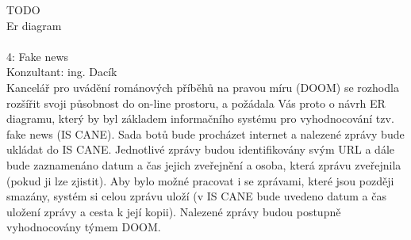 \documentclass{article}
\begin{document}
    TODO    \\
    Er diagram \\ \\

    4: Fake news \\
    Konzultant: ing. Dacík\\
    Kancelář pro uvádění románových příběhů na pravou míru (DOOM) se rozhodla rozšířit svoji působnost do on-line prostoru, a požádala Vás proto o návrh ER diagramu, který by byl základem informačního systému pro vyhodnocování tzv. fake news (IS CANE). Sada botů bude procházet internet a nalezené zprávy bude ukládat do IS CANE. Jednotlivé zprávy budou identifikovány svým URL a dále bude zaznamenáno datum a čas jejich zveřejnění a osoba, která zprávu zveřejnila (pokud ji lze zjistit). Aby bylo možné pracovat i se zprávami, které jsou později smazány, systém si celou zprávu uloží (v IS CANE bude uvedeno datum a čas uložení zprávy a cesta k její kopii).
Nalezené zprávy budou postupně vyhodnocovány týmem DOOM.
\end{document}
